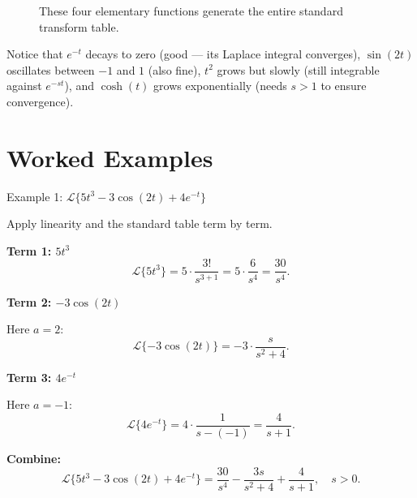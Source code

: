 \documentclass[12pt,a4paper]{article}
\begin{document}
\begin{figure}[ht]
\centering
{}
\caption{These four elementary functions generate the entire standard transform table.}
\end{figure}

\vspace{0.5em}
Notice that $e^{-t}$ decays to zero (good --- its Laplace integral converges), $\sin(2t)$
oscillates between $-1$ and $1$ (also fine), $t^2$ grows but slowly (still integrable
against $e^{-st}$), and $\cosh(t)$ grows exponentially (needs $s > 1$ to ensure convergence).

\section{Worked Examples}

\begin{infobox}{Example 1: $\mathcal{L}\{5t^3 - 3\cos(2t) + 4e^{-t}\}$}

Apply linearity and the standard table term by term.

\textbf{Term 1: $5t^3$}
\[
  \mathcal{L}\{5t^3\} = 5 \cdot \frac{3!}{s^{3+1}} = 5 \cdot \frac{6}{s^4} = \frac{30}{s^4}.
\]

\textbf{Term 2: $-3\cos(2t)$}

Here $a = 2$:
\[
  \mathcal{L}\{-3\cos(2t)\} = -3 \cdot \frac{s}{s^2 + 4}.
\]

\textbf{Term 3: $4e^{-t}$}

Here $a = -1$:
\[
  \mathcal{L}\{4e^{-t}\} = 4 \cdot \frac{1}{s - (-1)} = \frac{4}{s + 1}.
\]

\textbf{Combine:}
\[
  \mathcal{L}\{5t^3 - 3\cos(2t) + 4e^{-t}\}
  = \frac{30}{s^4} - \frac{3s}{s^2+4} + \frac{4}{s+1}, \quad s > 0.
\]
\end{infobox}
\end{document}
